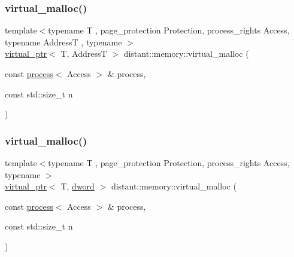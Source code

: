 \mbox{\label{namespacedistant_1_1memory_a4c70496966478cc4190de831ac4534ec}} 
\subsubsection{\texorpdfstring{virtual\+\_\+malloc()}{virtual\_malloc()}\hspace{0.1cm}{\footnotesize\ttfamily [1/2]}}
{\footnotesize\ttfamily template$<$typename T , page\+\_\+protection Protection, process\+\_\+rights Access, typename AddressT , typename $>$ \\
\mbox{\hyperlink{classdistant_1_1memory_1_1virtual__ptr}{virtual\+\_\+ptr}}$<$ T, AddressT $>$ distant\+::memory\+::virtual\+\_\+malloc (\begin{DoxyParamCaption}\item[{const \mbox{\hyperlink{classdistant_1_1kernel__objects_1_1process}{process}}$<$ Access $>$ \&}]{process,  }\item[{const std\+::size\+\_\+t}]{n }\end{DoxyParamCaption})}

\mbox{\label{namespacedistant_1_1memory_a3737676d3de70913b89d7c1dcd91739f}} 
\subsubsection{\texorpdfstring{virtual\+\_\+malloc()}{virtual\_malloc()}\hspace{0.1cm}{\footnotesize\ttfamily [2/2]}}
{\footnotesize\ttfamily template$<$typename T , page\+\_\+protection Protection, process\+\_\+rights Access, typename $>$ \\
\mbox{\hyperlink{classdistant_1_1memory_1_1virtual__ptr}{virtual\+\_\+ptr}}$<$ T, \mbox{\hyperlink{namespacedistant_a9fa41a5a1a17dcbd24da1c1855c92489}{dword}} $>$ distant\+::memory\+::virtual\+\_\+malloc (\begin{DoxyParamCaption}\item[{const \mbox{\hyperlink{classdistant_1_1kernel__objects_1_1process}{process}}$<$ Access $>$ \&}]{process,  }\item[{const std\+::size\+\_\+t}]{n }\end{DoxyParamCaption})}


